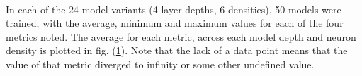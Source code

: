 \documentclass[12pt,letterpaper]{article}
\begin{document}
\paragraph*{}In each of the 24 model variants (4 layer depths, 6 densities), 50 models were trained, with the average, minimum and maximum values for each of the four metrics noted. The average for each metric, across each model depth and neuron density is plotted in fig. (\ref{results}). Note that the lack of a data point means that the value of that metric diverged to infinity or some other undefined value.

\begin{figure}[h]
	\centering
	\label{results}
\end{figure}
\end{document}
